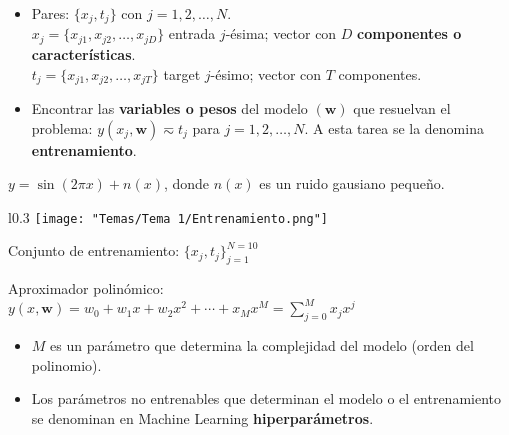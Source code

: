 \begin{itemize}[label=\color{red}\textbullet, leftmargin=*]
	\item {}
	
	Pares: $\{x_j,t_j\}$ con $j=1,2,\dots,N$.\\
	$x_j=\{x_{j1},x_{j2},\dots,x_{jD}\}$ entrada $j$-ésima; vector con $D$ \textbf{componentes o características}.\\
	$t_j=\{x_{j1},x_{j2},\dots,x_{jT}\}$ target $j$-ésimo; vector con $T$ componentes.
	\item {}
	
	Encontrar las \textbf{variables o pesos} del modelo $(\mathbf{w})$ que resuelvan el problema: $y(x_j,\mathbf{w})\eqsim t_j$ para $j=1,2,\dots,N$. A esta tarea se la denomina \textbf{entrenamiento}.
\end{itemize}

$y=\sin(2\pi x)+n(x)$, donde $n(x)$ es un ruido gausiano pequeño.

\begin{wrapfigure}[3]{l}{0.3\textwidth}
\texttt{[image: "Temas/Tema 1/Entrenamiento.png"]}
\end{wrapfigure}

Conjunto de entrenamiento: $\{x_j,t_j\}_{j=1}^{N=10}$

\begin{flushright}
\end{flushright}

Aproximador polinómico: $y(x,\mathbf{w})=w_0+w_1x+w_2x^2+\cdots+x_Mx^M=\sum_{j=0}^{M}x_jx^j$

\begin{itemize}
\item $M$ es un parámetro que determina la complejidad del modelo (orden del polinomio).
\item Los parámetros no entrenables que determinan el modelo o el entrenamiento se denominan en Machine Learning \textbf{hiperparámetros}.
\end{itemize}
